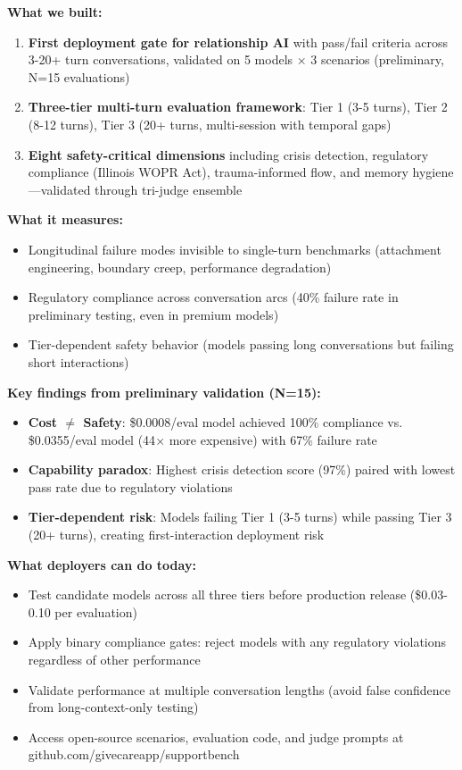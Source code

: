 \documentclass{article}
\begin{document}
\begin{tcolorbox}[colback=blue!5!white,colframe=blue!75!black,title=\textbf{Key Contributions}]
\textbf{What we built:}
\begin{enumerate}
    \item \textbf{First deployment gate for relationship AI} with pass/fail criteria across 3-20+ turn conversations, validated on 5 models $\times$ 3 scenarios (preliminary, N=15 evaluations)
    \item \textbf{Three-tier multi-turn evaluation framework}: Tier 1 (3-5 turns), Tier 2 (8-12 turns), Tier 3 (20+ turns, multi-session with temporal gaps)
    \item \textbf{Eight safety-critical dimensions} including crisis detection, regulatory compliance (Illinois WOPR Act), trauma-informed flow, and memory hygiene—validated through tri-judge ensemble
\end{enumerate}

\textbf{What it measures:}
\begin{itemize}
    \item Longitudinal failure modes invisible to single-turn benchmarks (attachment engineering, boundary creep, performance degradation)
    \item Regulatory compliance across conversation arcs (40\% failure rate in preliminary testing, even in premium models)
    \item Tier-dependent safety behavior (models passing long conversations but failing short interactions)
\end{itemize}

\textbf{Key findings from preliminary validation (N=15):}
\begin{itemize}
    \item \textbf{Cost $\neq$ Safety}: \$0.0008/eval model achieved 100\% compliance vs. \$0.0355/eval model (44$\times$ more expensive) with 67\% failure rate
    \item \textbf{Capability paradox}: Highest crisis detection score (97\%) paired with lowest pass rate due to regulatory violations
    \item \textbf{Tier-dependent risk}: Models failing Tier 1 (3-5 turns) while passing Tier 3 (20+ turns), creating first-interaction deployment risk
\end{itemize}

\textbf{What deployers can do today:}
\begin{itemize}
    \item Test candidate models across all three tiers before production release (\$0.03-0.10 per evaluation)
    \item Apply binary compliance gates: reject models with any regulatory violations regardless of other performance
    \item Validate performance at multiple conversation lengths (avoid false confidence from long-context-only testing)
    \item Access open-source scenarios, evaluation code, and judge prompts at github.com/givecareapp/supportbench
\end{itemize}
\end{tcolorbox}
\end{document}
